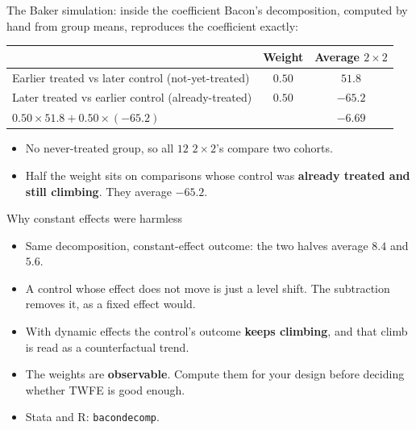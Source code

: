 \documentclass[
  11pt,
  ignorenonframetext,
  aspectratio=169,
]{beamer}
\providecommand{\tightlist}{%
  \setlength{\itemsep}{0pt}\setlength{\parskip}{0pt}}
\begin{document}
\begin{frame}{The Baker simulation: inside the coefficient}
\protect{}\label{the-baker-simulation-inside-the-coefficient}
Bacon's decomposition, computed by hand from group means, reproduces the
coefficient exactly:

\begin{center}\small
\begin{tabular}{lcc}
\toprule
 & Weight & Average $2 \times 2$ \\
\midrule
Earlier treated vs later control (not-yet-treated) & $0.50$ & $51.8$ \\
Later treated vs earlier control (already-treated) & $0.50$ & $-65.2$ \\
\midrule
$0.50 \times 51.8 + 0.50 \times (-65.2)$ & & $-6.69$ \\
\bottomrule
\end{tabular}
\end{center}

\begin{itemize}
\tightlist
\item
  No never-treated group, so all \(12\) \(2 \times 2\)'s compare two
  cohorts.
\item
  Half the weight sits on comparisons whose control was \textbf{already
  treated and still climbing}. They average \(-65.2\).
\end{itemize}
\end{frame}

\begin{frame}[fragile]{Why constant effects were harmless}
\protect{}\label{why-constant-effects-were-harmless}
\begin{itemize}
\tightlist
\item
  Same decomposition, constant-effect outcome: the two halves average
  \(8.4\) and \(5.6\).
\item
  A control whose effect does not move is just a level shift. The
  subtraction removes it, as a fixed effect would.
\item
  With dynamic effects the control's outcome \textbf{keeps climbing},
  and that climb is read as a counterfactual trend.
\end{itemize}

\vspace{0.4em}

\begin{itemize}
\tightlist
\item
  The weights are \textbf{observable}. Compute them for your design
  before deciding whether TWFE is good enough.
\item
  Stata and R: \texttt{bacondecomp}.
\end{itemize}
\end{frame}
\end{document}
